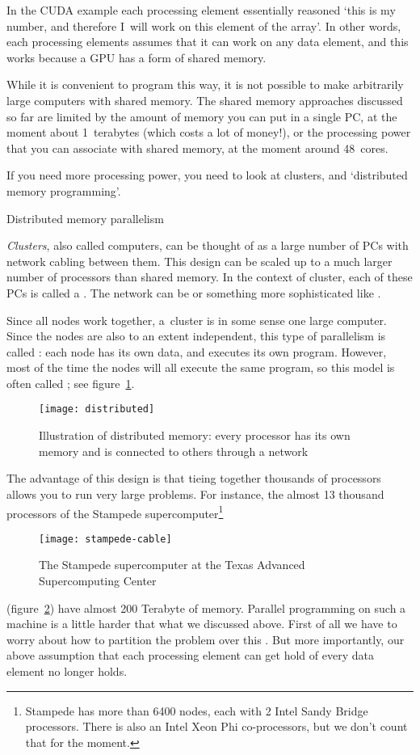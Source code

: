 In the CUDA example each
processing element essentially reasoned `this is my number, and
therefore I~will work on this element of the array'. 
In other words, each processing elements assumes that it can 
work on any data element, and this works
because a GPU has a form of shared memory.

While it is convenient to program this way, it is not possible to make
arbitrarily large computers with shared memory.
The shared memory approaches discussed so far are limited by the
amount of memory you can put in a single PC, at the moment about
1~terabytes (which costs a lot of money!), or the processing power
that you can associate with shared memory, at the moment around
48~cores.

If you need more processing power, you need to look at clusters,
and `distributed memory programming'.

 {Distributed memory parallelism}
\label{sec:spmd}

\emph{Clusters},
also called  computers,
can be thought of
as a large number of PCs with network cabling between them.
This design can be scaled up to a much larger number of processors
than shared memory.
In the context of cluster, each of these PCs
is called a . The network can be
 or something more sophisticated like .

Since all nodes work together, a~cluster is in some sense one
large computer. 
Since the nodes are also to an extent independent, this type of parallelism is
called : each node has its own data, and executes its own program.
However, most of the time the nodes will all execute
the same program, so this model is often called ; see figure~\ref{fig:spmd}.
\begin{figure}[ht]
  \texttt{[image: distributed]}
  \caption{Illustration of distributed memory: every processor has its
    own memory and is connected to others through a network}
  \label{fig:spmd}
\end{figure}
%
The advantage of this design is that tieing
together thousands of processors allows you to run very large problems.
For instance, the almost 13 thousand processors of the Stampede supercomputer\footnote
{Stampede has more than 6400 nodes, each with 2 Intel Sandy Bridge processors.
There is also an Intel Xeon Phi co-processors, but we don't count that for the moment.}
\begin{figure}[ht]
  \texttt{[image: stampede-cable]}
  \caption{The Stampede supercomputer at the Texas Advanced Supercomputing Center}
  \label{fig:stampede}
\end{figure}
(figure~\ref{fig:stampede}) have almost 200 Terabyte of memory.
Parallel programming on such a machine is a little harder
that what we discussed above.
First of all we have to worry about
how to partition the problem over this .
But more importantly, our above assumption that each processing element
can get hold of every data element no longer holds.

